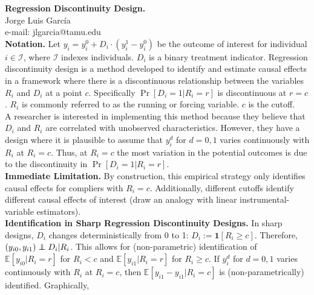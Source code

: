 
\let\counterwithout\relax
\let\counterwithin\relax
{}



\noindent \textbf{Regression Discontinuity Design.}\\
\noindent Jorge Luis García \\
\noindent e-mail: jlgarcia@tamu.edu\\

\noindent \textbf{Notation.} Let $y_{i} = y_{i}^0 + D_{i} \cdot \left( y_{i}^1 - y_{i}^0 \right)$ be the outcome of interest for individual $i \in \mathcal{I}$, where $\mathcal{I}$ indexes individuals. $D_{i}$ is a binary treatment indicator. Regression discontinuity design is a method developed to identify and estimate causal effects in a framework where there is a discontinuous relationship between the variables $R_{i}$ and $D_{i}$ at a point $c$. Specifically $\Pr \left[ D_{i} = 1 | R_i = r \right]$ is discontinuous at $r = c$. $R_{i}$ is commonly referred to as the running or forcing variable. $c$ is the cutoff.\\

\noindent A researcher is interested in implementing this method because they believe that $D_{i}$ and $R_{i}$ are correlated with unobserved characteristics. However, they have a design where it is plausible to assume that $y_{i}^d$ for $d = 0,1$ varies continuously with $R_i$ at $R_i = c$. Thus, at $R_i = c$ the most variation in the potential outcomes is due to the discontinuity in $\Pr \left[ D_{i} = 1 | R_i = r \right]$.\\

\noindent \textbf{Immediate Limitation.} By construction, this empirical strategy only identifies causal effects for compliers with $R_{i} = c$. Additionally, different cutoffs identify different causal effects of interest (draw an analogy with linear instrumental-variable estimators).\\ 

\noindent \textbf{Identification in Sharp Regression Discontinuity Designs.} In sharp designs, $D_{i}$ changes deterministically from 0 to 1: $D_{i} := \bm{1} \left[ R_{i} \geq c \right]$. Therefore, $\left( y_{i0}, y_{i1} \right) \independent D_{i} | R_{i}$. This allows for (non-parametric) identification of $\mathbb{E} \left[ y_{i0} | R_{i} = r\right]$ for $R_{i} < c$ and $\mathbb{E} \left[ y_{i1} | R_{i} = r\right]$ for $R_{i} \geq c$. If $y_{i}^d$ for $d = 0,1$ varies continuously with $R_i$ at $R_i = c$, then $\mathbb{E} \left[  y_{i1} - y_{i1} | R_{i} = c \right]$ is (non-parametrically) identified. Graphically, 

